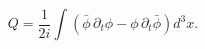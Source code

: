 \begin{equation}
Q=\frac{1}{2i}\int \left( \bar{\phi}\,\partial _{t}\phi -\phi
\,\partial _{t}\bar{\phi}\right) d^{3}x.
\end{equation}

